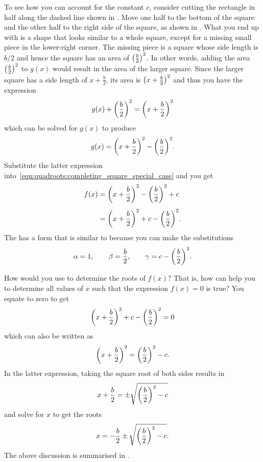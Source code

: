 \documentclass[a4paper,oneside,12pt]{article}
\begin{document}
To see how you can account for the constant $c$, consider cutting the
rectangle in half along the dashed line shown in
.
Move one half to the bottom of the square and the other half to the
right side of the square, as shown in
.  What
you end up with is a shape that looks similar to a whole square,
except for a missing small piece in the lower-right corner.  The
missing piece is a square whose side length is $b/2$ and hence the
square has an area of $\parenthesis*{\frac{b}{2}}^2$.  In other words,
adding the area $\parenthesis*{\frac{b}{2}}^2$ to $g(x)$ would result
in the area of the larger square.  Since the larger square has a side
length of $x + \frac{b}{2}$, its area is
$\parenthesis*{x + \frac{b}{2}}^2$ and thus you have the expression
\[
g(x) + \parenthesis*{\frac{b}{2}}^2
=
\parenthesis*{x + \frac{b}{2}}^2
\]
which can be solved for $g(x)$ to produce
\[
g(x)
=
\parenthesis*{x + \frac{b}{2}}^2
-
\parenthesis*{\frac{b}{2}}^2.
\]
Substitute the latter expression
into~\eqref{eqn:quadroots:completing_square_special_case} and you get
\begin{equation}
\label{eqn:quadroots:completing_square_special_case_squared}
\begin{aligned}
f(x)
&=
\parenthesis*{x + \frac{b}{2}}^2
-
\parenthesis*{\frac{b}{2}}^2
+
c \\[4pt]
&=
\parenthesis*{x + \frac{b}{2}}^2
+
c
-
\parenthesis*{\frac{b}{2}}^2.
\end{aligned}
\end{equation}
The 
has a form that is similar to
 because you
can make the substitutions
\[
\alpha
=
1,
\qquad
\beta
=
\frac{b}{2},
\qquad
\gamma
=
c
-
\parenthesis*{\frac{b}{2}}^2.
\]

How would you use
 to
determine the roots of $f(x)$?  That is, how can
 help
you to determine all values of $x$ such that the expression
$f(x) = 0$ is true?  You equate
 to
zero to get
\[
\parenthesis*{x + \frac{b}{2}}^2
+
c
-
\parenthesis*{\frac{b}{2}}^2
=
0
\]
which can also be written as
\[
\parenthesis*{x + \frac{b}{2}}^2
=
\parenthesis*{\frac{b}{2}}^2 - c.
\]
In the latter expression, taking the square root of both sides results
in
\[
x + \frac{b}{2}
=
\pm
\sqrt{
  \parenthesis*{\frac{b}{2}}^2 - c
}
\]
and solve for $x$ to get the roots
\[
x
=
-\frac{b}{2}
\pm
\sqrt{
  \parenthesis*{\frac{b}{2}}^2 - c
}.
\]
The above discussion is summarised in
.
\end{document}
